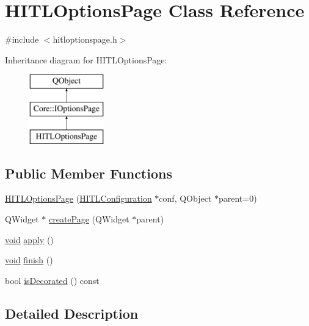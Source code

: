 \hypertarget{class_h_i_t_l_options_page}{\section{H\-I\-T\-L\-Options\-Page Class Reference}
\label{class_h_i_t_l_options_page}
}


{\ttfamily \#include $<$hitloptionspage.\-h$>$}

Inheritance diagram for H\-I\-T\-L\-Options\-Page\-:\begin{figure}[H]
\begin{center}
\leavevmode
\includegraphics[height=3.000000cm]{class_h_i_t_l_options_page}
\end{center}
\end{figure}
\subsection*{Public Member Functions}
\begin{DoxyCompactItemize}
\item 
\hyperlink{group___h_i_t_l_plugin_ga6f316a1c3e3ee76ad5d8931dbc861194}{H\-I\-T\-L\-Options\-Page} (\hyperlink{class_h_i_t_l_configuration}{H\-I\-T\-L\-Configuration} $\ast$conf, Q\-Object $\ast$parent=0)
\item 
Q\-Widget $\ast$ \hyperlink{group___h_i_t_l_plugin_ga82b1534b1cdc2ad63d8849636f64b8c9}{create\-Page} (Q\-Widget $\ast$parent)
\item 
\hyperlink{group___u_a_v_objects_plugin_ga444cf2ff3f0ecbe028adce838d373f5c}{void} \hyperlink{group___h_i_t_l_plugin_ga6554b77636be9ff76148c91411929d4a}{apply} ()
\item 
\hyperlink{group___u_a_v_objects_plugin_ga444cf2ff3f0ecbe028adce838d373f5c}{void} \hyperlink{group___h_i_t_l_plugin_ga2a1b2e14f1c4d4cd1c5f63c1c906f06d}{finish} ()
\item 
bool \hyperlink{group___h_i_t_l_plugin_ga0f6209b81c7a24419e848b6740d72f24}{is\-Decorated} () const 
\end{DoxyCompactItemize}


\subsection{Detailed Description}



